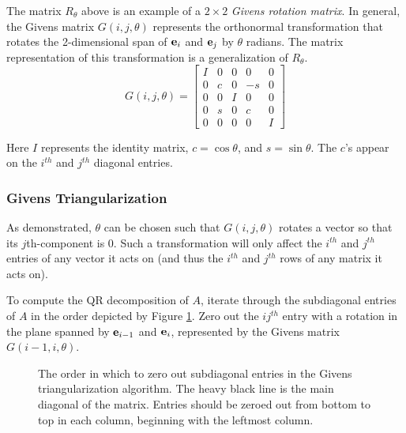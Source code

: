 The matrix $R_{\theta}$ above is an example of a $2 \times 2$ \emph{Givens rotation matrix}.
In general, the Givens matrix $G(i,j,\theta)$ represents the orthonormal transformation that rotates the 2-dimensional span of $\mathbf{e}_i$ and $\mathbf{e}_j$ by $\theta$ radians.
The matrix representation of this transformation is a generalization of $R_\theta$.
\[
G(i,j,\theta) =
\left[\begin{array}{ccccc}
I & 0 & 0 & 0 & 0 \\
0 & c & 0 & -s & 0 \\
0 & 0 & I & 0 & 0 \\
0 & s & 0 & c & 0 \\
0 & 0 & 0 & 0 & I
\end{array}\right]
\]

Here $I$ represents the identity matrix, $c=\cos \theta$, and $s=\sin \theta$.
The $c$'s appear on the $i^{th}$ and $j^{th}$ diagonal entries.

\subsubsection*{Givens Triangularization} %

As demonstrated, $\theta$ can be chosen such that $G(i,j,\theta)$ rotates a vector so that its $j$th-component is 0.
Such a transformation will only affect the $i^{th}$ and $j^{th}$ entries of any vector it acts on (and thus the $i^{th}$ and $j^{th}$ rows of any matrix it acts on).

To compute the QR decomposition of $A$, iterate through the subdiagonal entries of $A$ in the order depicted by Figure \ref{fig:Givens-iteration-order}.
Zero out the $ij^{th}$ entry with a rotation in the plane spanned by $\mathbf{e}_{i-1}$ and $\mathbf{e}_i$, represented by the Givens matrix $G(i-1,i,\theta)$.

\begin{figure}[H]
\centering
{}
\caption{The order in which to zero out subdiagonal entries in the Givens triangularization algorithm.
The heavy black line is the main diagonal of the matrix.
Entries should be zeroed out from bottom to top in each column, beginning with the leftmost column.}
\label{fig:Givens-iteration-order}
\end{figure}

